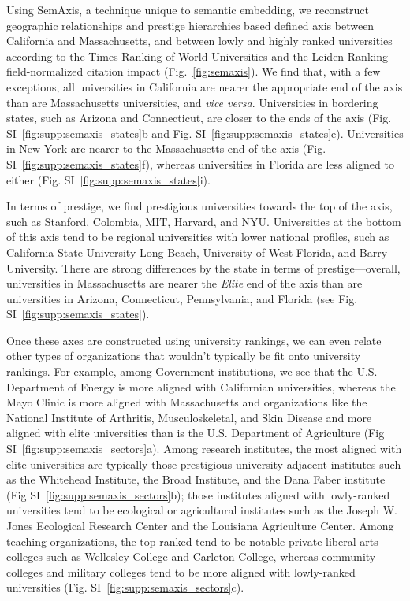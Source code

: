 \documentclass[12pt]{article} %
\begin{document}
Using SemAxis, a technique unique to semantic embedding, we reconstruct geographic relationships and prestige hierarchies based defined axis between California and Massachusetts, and between lowly and highly ranked universities according to the Times Ranking of World Universities and the Leiden Ranking field-normalized citation impact (Fig.~\ref{fig:semaxis}). 
We find that, with a few exceptions, all universities in California are nearer the appropriate end of the axis than are Massachusetts universities, and \textit{vice versa}.
Universities in bordering states, such as Arizona and Connecticut, are closer to the ends of the axis (Fig. SI~\ref{fig:supp:semaxis_states}b and Fig. SI~\ref{fig:supp:semaxis_states}e). 
Universities in New York are nearer to the Massachusetts end of the axis (Fig. SI~\ref{fig:supp:semaxis_states}f), whereas universities in Florida are less aligned to either (Fig. SI~\ref{fig:supp:semaxis_states}i). 

In terms of prestige, we find prestigious universities towards the top of the axis, such as Stanford, Colombia, MIT, Harvard, and NYU. 
Universities at the bottom of this axis tend to be regional universities with lower national profiles, such as California State University Long Beach, University of West Florida, and Barry University. 
There are strong differences by the state in terms of prestige—overall, universities in Massachusetts are nearer the \textit{Elite} end of the axis than are universities in Arizona, Connecticut, Pennsylvania, and Florida (see Fig. SI~\ref{fig:supp:semaxis_states}). 

Once these axes are constructed using university rankings, we can even relate other types of organizations that wouldn't typically be fit onto university rankings.
For example, among Government institutions, we see that the U.S. Department of Energy is more aligned with Californian universities, whereas the Mayo Clinic is more aligned with Massachusetts and organizations like the National Institute of Arthritis, Musculoskeletal, and Skin Disease and more aligned with elite universities than is the U.S. Department of Agriculture (Fig SI~\ref{fig:supp:semaxis_sectors}a).
Among research institutes, the most aligned with elite universities are typically those prestigious university-adjacent institutes such as the Whitehead Institute, the Broad Institute, and the Dana Faber institute (Fig SI~\ref{fig:supp:semaxis_sectors}b); those institutes aligned with lowly-ranked universities tend to be ecological or agricultural institutes such as the Joseph W. Jones Ecological Research Center and the Louisiana Agriculture Center. 
Among teaching organizations, the top-ranked tend to be notable private liberal arts colleges such as Wellesley College and Carleton College, whereas community colleges and military colleges tend to be more aligned with lowly-ranked universities (Fig. SI~\ref{fig:supp:semaxis_sectors}c). 
\end{document}
